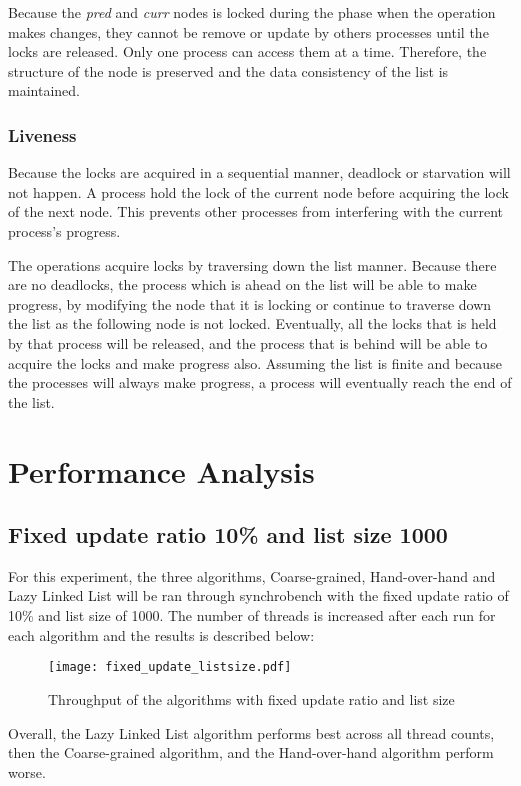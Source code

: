 \documentclass[12pt,a4paper]{article}
\begin{document}
Because the \textit{pred} and \textit{curr} nodes is locked during the phase when the operation makes changes, they cannot be remove or update by others processes until the locks are released. Only one process can access them at a time. Therefore, the structure of the node is preserved and the data consistency of the list is maintained.

\subsubsection{Liveness}
Because the locks are acquired in a sequential manner, deadlock or starvation will not happen. A process hold the lock of the current node before acquiring the lock of the next node. This prevents other processes from interfering with the current process's progress.

The operations acquire locks by traversing down the list manner. Because there are no deadlocks, the process which is ahead on the list will be able to make progress, by modifying the node that it is locking or continue to traverse down the list as the following node is not locked. Eventually, all the locks that is held by that process will be released, and the process that is behind will be able to acquire the locks and make progress also. Assuming the list is finite and because the processes will always make progress, a process will eventually reach the end of the list.

\newpage
\section{Performance Analysis}
\subsection{Fixed update ratio 10\% and list size 1000}
For this experiment, the three algorithms, Coarse-grained, Hand-over-hand and Lazy Linked List will be ran through synchrobench with the fixed update ratio of 10\% and list size of 1000. The number of threads is increased after each run for each algorithm and the results is described below:

\begin{figure}[h]
    \centering
    \texttt{[image: fixed\_update\_listsize.pdf]}
    \caption{Throughput of the algorithms with fixed update ratio and list size}
    \label{fig:fixed_update_listsize}
\end{figure}

Overall, the Lazy Linked List algorithm performs best across all thread counts, then the Coarse-grained algorithm, and the Hand-over-hand algorithm perform worse. 
\end{document}
